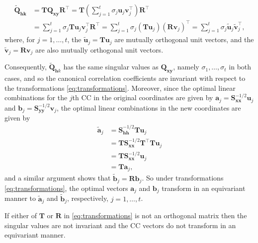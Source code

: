 \documentclass[]{book}
\theoremstyle{definition}
\theoremstyle{definition}
\theoremstyle{definition}
\theoremstyle{remark}
\begin{document}
\begin{align*}
\tilde{\mathbf Q}_{\mathbf h\mathbf k}&={\mathbf T }\mathbf Q_{\mathbf x\mathbf y}{\mathbf R}^\top
={\mathbf T} \left ( \sum_{j=1}^t \sigma_j {\mathbf u}_j {\mathbf v}_j^\top \right){\mathbf R}^\top\\
&=\sum_{j=1}^t \sigma_j {\mathbf T}{\mathbf u}_j {\mathbf v}_j^\top {\mathbf R}^\top
=\sum_{j=1}^t \sigma_j \left ( {\mathbf T} {\mathbf u}_j \right )\left ({\mathbf R}{\mathbf v}_j  \right )^\top
=\sum_{j=1}^t \sigma_j \tilde{\mathbf u}_j \tilde{\mathbf v}_j^\top,
\end{align*}
where, for \(j=1, \ldots,t\), the \(\tilde{\mathbf u}_j={\mathbf T}\mathbf u_j\) are mutually orthogonal unit vectors,
and the \(\tilde{\mathbf v}_j={\mathbf R}{\mathbf v}_j\) are also mutually orthogonal unit vectors.

Consequently, \(\tilde{\mathbf Q}_{\mathbf h k}\) has the same singular values as \(\mathbf Q_{\mathbf x\mathbf y}\), namely \(\sigma_1, \ldots , \sigma_t\) in both cases, and so the canonical correlation coefficients are invariant with respect to the transformations \eqref{eq:transformations}. Moreover, since the optimal linear combinations for the \(j\)th CC in the original coordinates are given by \(\mathbf a_j =\mathbf S_{\mathbf x\mathbf x}^{-1/2}{\mathbf u}_j\) and \(\mathbf b_j=\mathbf S_{\mathbf y\mathbf y}^{-1/2}{\mathbf v}_j\), the optimal linear combinations in the new coordinates are given by
\begin{align*}
\tilde{\mathbf a}_{j}&=\mathbf S_{\mathbf h\mathbf h}^{-1/2}{\mathbf T}{\mathbf u}_j\\
&={\mathbf T}\mathbf S_{\mathbf x\mathbf x}^{-1/2}{\mathbf T}^\top {\mathbf T}{\mathbf u}_j\\
&={\mathbf T}\mathbf S_{\mathbf x\mathbf x}^{-1/2}{\mathbf u}_j \\
&={\mathbf T}\mathbf a_{j},
\end{align*}
and a similar argument shows that \(\tilde{\mathbf b}_{j}={\mathbf R}\mathbf b_{j}\). So under transformations \eqref{eq:transformations},
the optimal vectors \(\mathbf a_{j}\) and \(\mathbf b_{j}\) transform in an equivariant manner to \(\tilde{\mathbf a}_{j}\) and \(\tilde{\mathbf b}_{j}\), respectively, \(j=1, \ldots , t\).

If either of \(\mathbf T\) or \(\mathbf R\) in \eqref{eq:transformations} is not an orthogonal matrix then the singular values are not invariant and the CC vectors do not transform in an equivariant manner.
\end{document}
